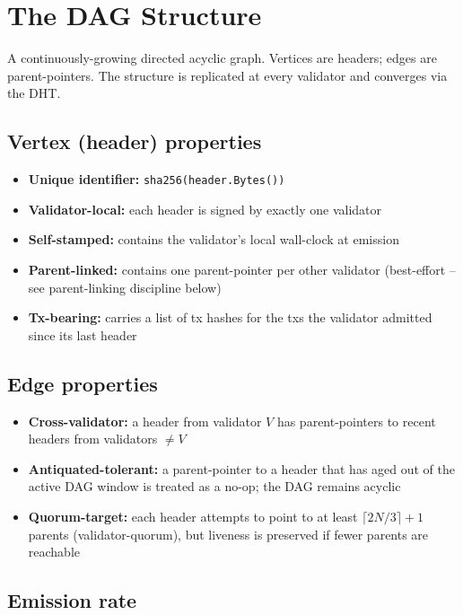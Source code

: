\section{The DAG Structure}

A continuously-growing directed acyclic graph. Vertices are headers;
edges are parent-pointers. The structure is replicated at every
validator and converges via the DHT.

\subsection{Vertex (header) properties}

\begin{itemize}[leftmargin=2em,nosep]
\item \textbf{Unique identifier:} \texttt{sha256(header.Bytes())}
\item \textbf{Validator-local:} each header is signed by exactly one
  validator
\item \textbf{Self-stamped:} contains the validator's local wall-clock
  at emission
\item \textbf{Parent-linked:} contains one parent-pointer per other
  validator (best-effort -- see parent-linking discipline below)
\item \textbf{Tx-bearing:} carries a list of tx hashes for the txs
  the validator admitted since its last header
\end{itemize}

\subsection{Edge properties}

\begin{itemize}[leftmargin=2em,nosep]
\item \textbf{Cross-validator:} a header from validator $V$ has
  parent-pointers to recent headers from validators $\neq V$
\item \textbf{Antiquated-tolerant:} a parent-pointer to a header that
  has aged out of the active DAG window is treated as a no-op; the
  DAG remains acyclic
\item \textbf{Quorum-target:} each header attempts to point to at
  least $\lceil 2N/3 \rceil + 1$ parents (validator-quorum), but
  liveness is preserved if fewer parents are reachable
\end{itemize}

\subsection{Emission rate}

